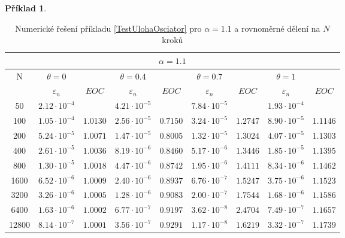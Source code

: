\documentclass[a4paper,12pt,twoside]{article}
\theoremstyle{definition}
\newtheorem{prikl}[veta]{Příklad}
\theoremstyle{remark}
\numberwithin{equation}{section}
\numberwithin{table}{section}
\numberwithin{figure}{section}
\begin{document}
\begin{prikl}
	\begin{table}[h!]
	\centering
	\caption{Numerické řešení příkladu \ref{TestUlohaOsciator} pro $\alpha = 1.1$ a rovnoměrné dělení na $N$ kroků}
	\label{tab:tabulkaTestovacíÚloha(2),alpha=1.1}
	\begin{tabular}{|c||cc|cc|cc|cc|}
		\hline
		\multicolumn{9}{|c|}{$\alpha = 1.1$} \\
		\hline
		N 	  & $\theta = 0$ & & $\theta = 0.4$ && $\theta = 0.7$ & &$\theta = 1$& \\
		\hline
		& $\varepsilon_{n}$    & $EOC$    & $\varepsilon_{n}$    &$EOC$   & $\varepsilon_{n}$    &$EOC$    &$\varepsilon_{n}$    &$EOC$ \\
		50 	  & $2.12 \cdot 10^{-4}$ & 		    & $4.21 \cdot 10^{-5}$ &		& $7.84 \cdot 10^{-5}$ & 	     &$1.93 \cdot 10^{-4}$& \\
		\hline
		100   & $1.05 \cdot 10^{-4}$ & $1.0130$ & $2.56 \cdot 10^{-5}$ &$0.7150$& $3.24 \cdot 10^{-5}$ &$1.2747$ &$8.90 \cdot 10^{-5}$&$1.1146$ \\
		\hline
		200   & $5.24 \cdot 10^{-5}$ & $1.0071$ & $1.47 \cdot 10^{-5}$ &$0.8005$& $1.32 \cdot 10^{-5}$ &$1.3024$ &$4.07 \cdot 10^{-5}$&$1.1303$\\
		\hline
		400   & $2.61 \cdot 10^{-5}$ & $1.0036$ & $8.19 \cdot 10^{-6}$ &$0.8460$& $5.17 \cdot 10^{-6}$ &$1.3446$ &$1.85 \cdot 10^{-5}$&$1.1395$ \\
		\hline
		800   & $1.30 \cdot 10^{-5}$ & $1.0018$ & $4.47 \cdot 10^{-6}$ &$0.8742$& $1.95 \cdot 10^{-6}$ &$1.4111$ &$8.34 \cdot 10^{-6}$&$1.1462$ \\
		\hline
		1600  & $6.52 \cdot 10^{-6}$ & $1.0009$ & $2.40 \cdot 10^{-6}$ &$0.8937$& $6.76 \cdot 10^{-7}$ &$1.5247$ &$3.75 \cdot 10^{-6}$&$1.1523$ \\
		\hline
		3200  & $3.26 \cdot 10^{-6}$ & $1.0005$ & $1.28 \cdot 10^{-6}$ &$0.9083$& $2.00 \cdot 10^{-7}$ &$1.7544$ &$1.68 \cdot 10^{-6}$&$1.1586$ \\
		\hline
		6400  & $1.63 \cdot 10^{-6}$ & $1.0002$ & $6.77 \cdot 10^{-7}$ &$0.9197$& $3.62 \cdot 10^{-8}$ &$2.4704$ &$7.49 \cdot 10^{-7}$&$1.1657$ \\
		\hline
		12800 & $8.14 \cdot 10^{-7}$ & $1.0001$ & $3.56 \cdot 10^{-7}$ &$0.9291$& $1.17 \cdot 10^{-8}$ &$1.6219$ &$3.32 \cdot 10^{-7}$&$1.1739$ \\
		\hline
	\end{tabular}
	\end{table}


\end{prikl}
\end{document}
